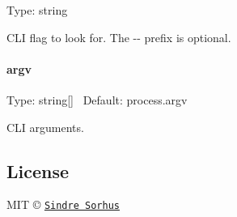 Type\+: {\ttfamily string}

C\+LI flag to look for. The {\ttfamily -\/-\/} prefix is optional.

\paragraph*{argv}

Type\+: {\ttfamily string\mbox{[}\mbox{]}}~\newline
 Default\+: {\ttfamily process.\+argv}

C\+LI arguments.

\subsection*{License}

M\+IT © \href{https://sindresorhus.com}{\tt Sindre Sorhus} 